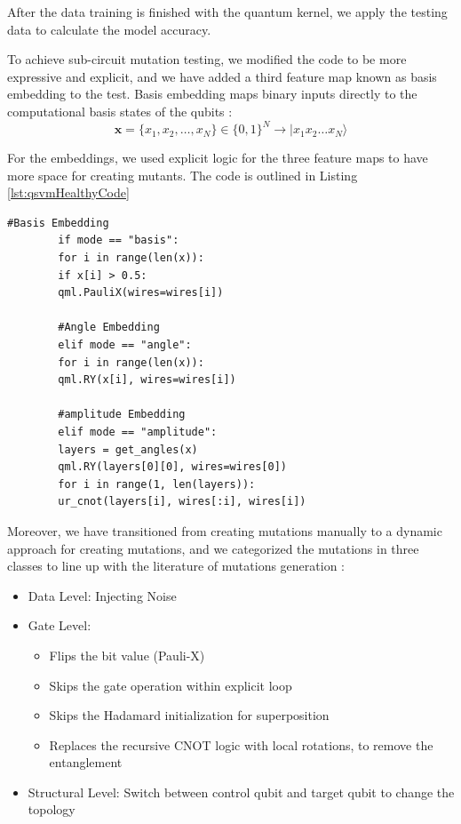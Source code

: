 \documentclass[12pt,a4paper]{article}
\begin{document}
	
	After the data training is finished with the quantum kernel, we apply the testing data to calculate the model accuracy.
	
	To achieve sub-circuit mutation testing, we modified the code to be more expressive and explicit, and we have added a third feature map known as basis embedding to the test. Basis embedding maps binary inputs directly to the computational basis states of the qubits \cite{schuld2018}:
			$$ \mathbf{x} = \{x_1, x_2, \dots, x_N\} \in \{0,1\}^N \rightarrow |x_1 x_2 \dots x_N\rangle $$
		
		For the embeddings, we used explicit logic for the three feature maps to have more space for creating mutants. The code is outlined in Listing \ref{lst:qsvmHealthyCode}
	
	\begin{lstlisting}[caption=Standard QSVM Script (Explicit Embedding Logic), label={lst:qsvmHealthyCode}]
		#Basis Embedding
		if mode == "basis":
		for i in range(len(x)):
		if x[i] > 0.5: 
		qml.PauliX(wires=wires[i])
		
		#Angle Embedding
		elif mode == "angle":
		for i in range(len(x)):
		qml.RY(x[i], wires=wires[i])
		
		#amplitude Embedding		
		elif mode == "amplitude":
		layers = get_angles(x)
		qml.RY(layers[0][0], wires=wires[0])
		for i in range(1, len(layers)): 
		ur_cnot(layers[i], wires[:i], wires[i])
	\end{lstlisting}
	
	Moreover, we have transitioned from creating mutations manually to a dynamic approach for creating mutations, and we categorized the mutations in three classes to line up with the literature of mutations generation \cite{9844849, qMutphyFortunato}:
	\begin{itemize}
		\item Data Level: Injecting Noise
		\item Gate Level: 
		\begin{itemize}
			\item Flips the bit value (Pauli-X)
			\item Skips the gate operation within explicit loop
			\item Skips the Hadamard initialization for superposition
			\item Replaces the recursive CNOT logic with local rotations, to remove the entanglement
		\end{itemize}
		\item Structural Level: Switch between control qubit and target qubit to change the topology
	\end{itemize}
	
\end{document}
